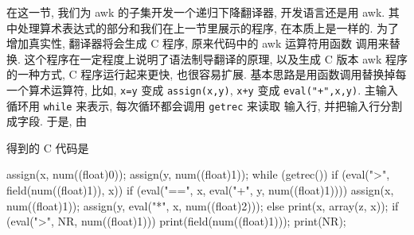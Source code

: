 在这一节, 我们为 awk 的子集开发一个递归下降翻译器, 开发语言还是用 awk.
其中处理算术表达式的部分和我们在上一节里展示的程序, 在本质上是一样的.
为了增加真实性, 翻译器将会生成 C 程序, 原来代码中的 awk 运算符用函数
调用来替换. 这个程序在一定程度上说明了语法制导翻译的原理, 以及生成
C 版本 awk 程序的一种方式, C 程序运行起来更快, 也很容易扩展.
基本思路是用函数调用替换掉每一个算术运算符, 比如, \texttt{x=y} 变成
\texttt{assign(x,y)}, \texttt{x+y} 变成 \texttt{eval("+",x,y)}. 主输入
循环用 \texttt{while} 来表示, 每次循环都会调用 \texttt{getrec} 来读取
输入行, 并把输入行分割成字段. 于是, 由
得到的 C 代码是
\begin{file}
    assign(x, num((float)0));
    assign(y, num((float)1));
    while (getrec()) {
            if (eval(">", field(num((float)1)), x)) {
                    if (eval("==", x, eval("+", y, num((float)1)))) {
                            assign(x, num((float)1));
                            assign(y, eval("*", x, num((float)2)));
                    } else {
                            print(x, array(z, x));
                    }
            }
            if (eval(">", NR, num((float)1))) {
                    print(field(num((float)1)));
            }
    }
    print(NR);
\end{file}

